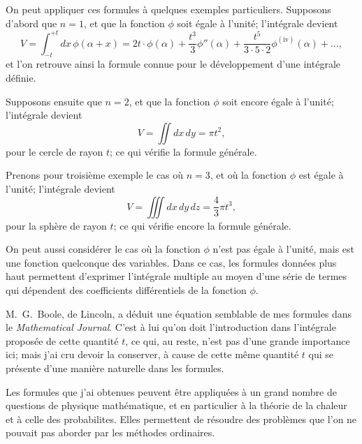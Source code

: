 \documentclass[11pt,a4paper]{article}
\begin{document}
\newpage
\setcounter{page}{202}

On peut appliquer ces formules \`{a} quelques exemples particuliers. Supposons
d'abord que $n=1$, et que la fonction $\phi$ soit \'{e}gale \`{a} l'unit\'{e}; l'int\'{e}grale devient
\[
V = \int_{-t}^{+t} dx \, \phi(\alpha + x) = 2t \cdot \phi(\alpha) + \frac{t^{3}}{3} \phi''(\alpha) + \frac{t^{5}}{3 \cdot 5 \cdot 2} \phi^{(\text{iv})}(\alpha) + \ldots,
\]
et l'on retrouve ainsi la formule connue pour le d\'{e}veloppement d'une int\'{e}grale d\'{e}finie.

Supposons ensuite que $n=2$, et que la fonction $\phi$ soit encore \'{e}gale \`{a} l'unit\'{e};
l'int\'{e}grale devient
\[
V = \iint dx \, dy = \pi t^{2},
\]
pour le cercle de rayon $t$; ce qui v\'{e}rifie la formule g\'{e}n\'{e}rale.

\newpage
\setcounter{page}{203}

Prenons pour troisi\`{e}me exemple le cas o\`{u} $n=3$, et o\`{u} la fonction $\phi$ est \'{e}gale \`{a}
l'unit\'{e}; l'int\'{e}grale devient
\[
V = \iiint dx \, dy \, dz = \frac{4}{3}\pi t^{3},
\]
pour la sph\`{e}re de rayon $t$; ce qui v\'{e}rifie encore la formule g\'{e}n\'{e}rale.

On peut aussi consid\'{e}rer le cas o\`{u} la fonction $\phi$ n'est pas \'{e}gale \`{a} l'unit\'{e}, mais
est une fonction quelconque des variables. Dans ce cas, les formules donn\'{e}es plus haut
permettent d'exprimer l'int\'{e}grale multiple au moyen d'une s\'{e}rie de termes qui d\'{e}pendent
des coefficients diff\'{e}rentiels de la fonction $\phi$.

\newpage
\setcounter{page}{204}

M.~G.~Boole, de Lincoln, a d\'{e}duit une \'{e}quation semblable de mes formules dans
le \textit{Mathematical Journal}. C'est \`{a} lui qu'on doit l'introduction dans l'int\'{e}grale propos\'{e}e
de cette quantit\'{e} $t$, ce qui, au reste, n'est pas d'une grande importance ici; mais j'ai
cru devoir la conserver, \`{a} cause de cette m\^{e}me quantit\'{e} $t$ qui se pr\'{e}sente d'une mani\`{e}re
naturelle dans les formules.

Les formules que j'ai obtenues peuvent \^{e}tre appliqu\'{e}es \`{a} un grand nombre de questions
de physique math\'{e}matique, et en particulier \`{a} la th\'{e}orie de la chaleur et \`{a} celle des
probabilites. Elles permettent de r\'{e}soudre des probl\`{e}mes que l'on ne pouvait pas
aborder par les m\'{e}thodes ordinaires.

\newpage
\setcounter{page}{205}
\end{document}
